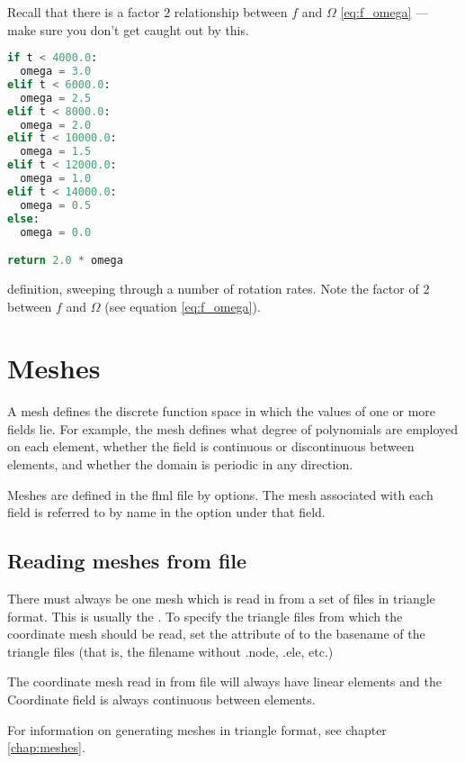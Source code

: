 Recall that there is a factor $2$ relationship between $f$ and $\Omega$
\eqref{eq:f_omega} --- make sure you don't get caught out by this.

\begin{example}
\begin{lstlisting}[language = Python]
if t < 4000.0:
  omega = 3.0
elif t < 6000.0:
  omega = 2.5
elif t < 8000.0:
  omega = 2.0
elif t < 10000.0:
  omega = 1.5
elif t < 12000.0:
  omega = 1.0
elif t < 14000.0:
  omega = 0.5
else:
  omega = 0.0

return 2.0 * omega
\end{lstlisting}
\caption{ definition, sweeping through a number of
         rotation rates. Note the factor of $2$ between $f$ and $\Omega$ (see
         equation \eqref{eq:f_omega}).}
\label{ex:python_f_plane}
\end{example}


\section{Meshes}\label{Sect:Mesh}

A mesh defines the discrete
function space in which the values of one or more fields lie. For example, the mesh
defines what degree of polynomials are employed on each element, whether the
field is continuous or discontinuous between elements, and whether the
domain is periodic in any direction. 

Meshes are defined in the flml file by  options. The
mesh associated with each field is referred to by name in the
 option under that field.

\subsection{Reading meshes from file}
There must always be one mesh which is read in from a set of files in
triangle format. This is usually the . To specify the
triangle files from which the coordinate mesh should be read, set the
 attribute of
 to the basename
of the triangle files (that is, the filename without .node, .ele, etc.)

The coordinate mesh read in from file will always have linear elements and
the Coordinate field is always continuous between elements.

For information on generating meshes in triangle format, see chapter
\ref{chap:meshes}. 

